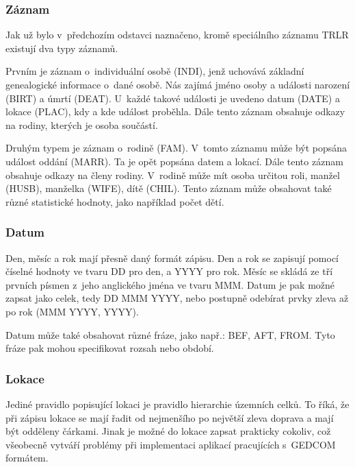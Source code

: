 \subsubsection{Záznam}
Jak už bylo v~předchozím odstavci naznačeno, kromě speciálního záznamu TRLR existují dva typy záznamů. 

Prvním je záznam o~individuální osobě (INDI), jenž uchovává základní genealogické informace o~dané osobě. Nás zajímá jméno osoby a události narození (BIRT) a úmrtí (DEAT). U~každé takové události je uvedeno datum (DATE) a lokace (PLAC), kdy a kde událost proběhla. Dále tento záznam obsahuje odkazy na rodiny, kterých je osoba součástí. 

Druhým typem je záznam o~rodině (FAM). V~tomto záznamu může být popsána událost oddání (MARR). Ta je opět popsána datem a lokací. Dále tento záznam obsahuje odkazy na členy rodiny. V~rodině může mít osoba určitou roli, manžel (HUSB), manželka (WIFE), dítě (CHIL). Tento záznam může obsahovat také různé statistické hodnoty, jako například počet dětí.


\subsubsection{Datum}
Den, měsíc a rok mají přesně daný formát zápisu. Den a rok se zapisují pomocí číselné hodnoty ve tvaru DD pro den, a YYYY pro rok. Měsíc se skládá ze tří prvních písmen z~jeho anglického jména ve tvaru MMM. Datum je pak možné zapsat jako celek, tedy DD MMM YYYY, nebo postupně odebírat prvky zleva až po rok (MMM YYYY, YYYY). 

Datum může také obsahovat různé fráze, jako např.: BEF, AFT, FROM. Tyto fráze pak mohou specifikovat rozsah nebo období.

\subsubsection{Lokace}
Jediné pravidlo popisující lokaci je pravidlo hierarchie územních celků. To říká, že při zápisu lokace se mají řadit od nejmenšího po největší zleva doprava a mají být odděleny čárkami. Jinak je možné do lokace zapsat prakticky cokoliv, což všeobecně vytváří problémy při implementaci aplikací pracujících s~GEDCOM formátem.
